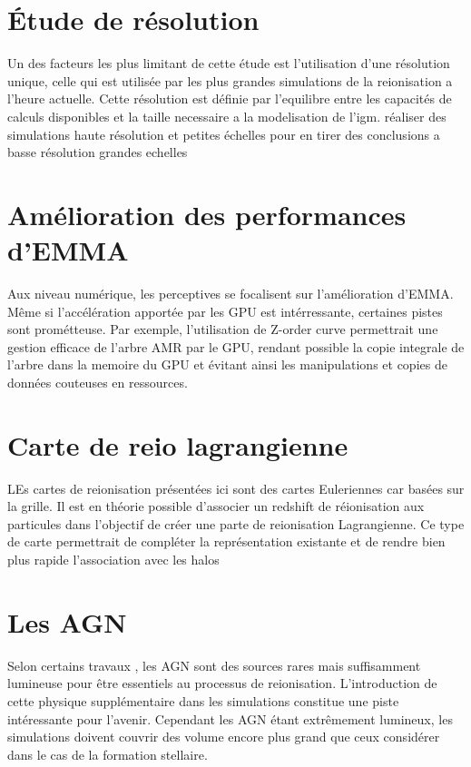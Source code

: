 \section{Étude de résolution}
Un des facteurs les plus limitant de cette étude est l'utilisation d'une résolution unique, celle qui est utilisée par les plus grandes simulations de la reionisation a l'heure actuelle.
Cette résolution est définie par l'equilibre entre les capacités de calculs disponibles et la taille necessaire a la modelisation de l'igm. 
réaliser des simulations haute résolution et petites échelles pour en tirer des conclusions a basse résolution grandes echelles


\section{Amélioration des performances d'EMMA}

Aux niveau numérique, les perceptives se focalisent sur l'amélioration d'EMMA. 
Même si l'accélération apportée par les GPU est intérressante, certaines pistes sont prométteuse.
Par exemple, l'utilisation de Z-order curve permettrait une gestion efficace de l'arbre AMR par le GPU, rendant possible la copie integrale de l'arbre dans la memoire du GPU et évitant ainsi les manipulations et copies de données couteuses en ressources.

\section{Carte de reio lagrangienne}
LEs cartes de reionisation présentées ici sont des cartes Euleriennes car basées sur la grille.
Il est en théorie possible d'associer un redshift de réionisation aux particules dans l'objectif de créer une parte de reionisation Lagrangienne.
Ce type de carte permettrait de compléter la représentation existante et de rendre bien plus rapide l'association avec les halos

\section{Les AGN}

Selon certains travaux \cite{chardin_large-scale_2017}, les AGN sont des sources rares mais suffisamment lumineuse pour être essentiels au processus de reionisation.
L'introduction de cette physique supplémentaire dans les simulations constitue une piste intéressante pour l'avenir.
Cependant les AGN étant extrêmement lumineux, les simulations doivent couvrir des volume encore plus grand que ceux considérer dans le cas de la formation stellaire.

